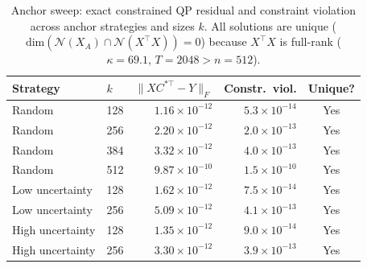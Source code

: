 \begin{table}[t]
\centering
\caption{%
  Anchor sweep: exact constrained QP residual and constraint violation
  across anchor strategies and sizes $k$.
  All solutions are unique ($\text{dim}(\mathcal{N}(X_A)\cap\mathcal{N}(X^\top X))=0$)
  because $X^\top X$ is full-rank ($\kappa = 69.1$, $T{=}2048 > n{=}512$).}
\label{tab:exp2}
\begin{tabular}{llrrc}
\toprule
\textbf{Strategy} & $k$ & $\|XC^{*\top}-Y\|_F$ & Constr.\ viol. & Unique? \\
\midrule
Random           & 128 & $1.16\times10^{-12}$ & $5.3\times10^{-14}$ & Yes \\
Random           & 256 & $2.20\times10^{-12}$ & $2.0\times10^{-13}$ & Yes \\
Random           & 384 & $3.32\times10^{-12}$ & $4.0\times10^{-13}$ & Yes \\
Random           & 512 & $9.87\times10^{-10}$ & $1.5\times10^{-10}$ & Yes \\
\midrule
Low uncertainty  & 128 & $1.62\times10^{-12}$ & $7.5\times10^{-14}$ & Yes \\
Low uncertainty  & 256 & $5.09\times10^{-12}$ & $4.1\times10^{-13}$ & Yes \\
High uncertainty & 128 & $1.35\times10^{-12}$ & $9.0\times10^{-14}$ & Yes \\
High uncertainty & 256 & $3.30\times10^{-12}$ & $3.9\times10^{-13}$ & Yes \\
\bottomrule
\end{tabular}
\end{table}
